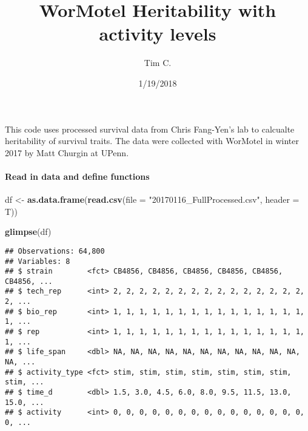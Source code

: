 \documentclass[]{article}
\title{WorMotel Heritability with activity levels}
\author{Tim C.}
\date{1/19/2018}
\newenvironment{Shaded}{\begin{snugshade}}{\end{snugshade}}
\newcommand{\DataTypeTok}[1]{\textcolor[rgb]{0.13,0.29,0.53}{#1}}
\newcommand{\KeywordTok}[1]{\textcolor[rgb]{0.13,0.29,0.53}{\textbf{#1}}}
\newcommand{\NormalTok}[1]{#1}
\newcommand{\StringTok}[1]{\textcolor[rgb]{0.31,0.60,0.02}{#1}}
\let\oldparagraph\paragraph
\renewcommand{\paragraph}[1]{\oldparagraph{#1}\mbox{}}
\begin{document}
\maketitle

This code uses processed survival data from Chris Fang-Yen's lab to
calcualte heritability of survival traits. The data were collected with
WorMotel in winter 2017 by Matt Churgin at UPenn.

\hypertarget{read-in-data-and-define-functions}{%
\paragraph{Read in data and define
functions}\label{read-in-data-and-define-functions}}

\begin{Shaded}
\begin{Highlighting}[]
\NormalTok{df <-}\StringTok{ }\KeywordTok{as.data.frame}\NormalTok{(}\KeywordTok{read.csv}\NormalTok{(}\DataTypeTok{file =} \StringTok{"20170116_FullProcessed.csv"}\NormalTok{, }\DataTypeTok{header =}\NormalTok{ T))}

\KeywordTok{glimpse}\NormalTok{(df)}
\end{Highlighting}
\end{Shaded}

\begin{verbatim}
## Observations: 64,800
## Variables: 8
## $ strain        <fct> CB4856, CB4856, CB4856, CB4856, CB4856, CB4856, ...
## $ tech_rep      <int> 2, 2, 2, 2, 2, 2, 2, 2, 2, 2, 2, 2, 2, 2, 2, 2, ...
## $ bio_rep       <int> 1, 1, 1, 1, 1, 1, 1, 1, 1, 1, 1, 1, 1, 1, 1, 1, ...
## $ rep           <int> 1, 1, 1, 1, 1, 1, 1, 1, 1, 1, 1, 1, 1, 1, 1, 1, ...
## $ life_span     <dbl> NA, NA, NA, NA, NA, NA, NA, NA, NA, NA, NA, NA, ...
## $ activity_type <fct> stim, stim, stim, stim, stim, stim, stim, stim, ...
## $ time_d        <dbl> 1.5, 3.0, 4.5, 6.0, 8.0, 9.5, 11.5, 13.0, 15.0, ...
## $ activity      <int> 0, 0, 0, 0, 0, 0, 0, 0, 0, 0, 0, 0, 0, 0, 0, 0, ...
\end{verbatim}
\end{document}
